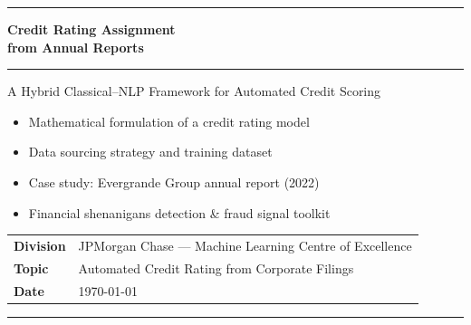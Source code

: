 \documentclass[12pt, a4paper]{article}
\begin{document}
\begin{titlepage}
  \centering
  \vspace*{2cm}

  {\color{jpblue}\rule{\linewidth}{2pt}}
  \vspace{0.5cm}

  {\Huge\bfseries\color{jpblue}
    Credit Rating Assignment\\[0.3em]
    from Annual Reports}

  \vspace{0.4cm}
  {\color{accentgold}\rule{0.6\linewidth}{1.5pt}}
  \vspace{0.5cm}

  {\large\color{jpdark}
    A Hybrid Classical–NLP Framework for Automated Credit Scoring}

  \vspace{1.5cm}

  \begin{tcolorbox}[
    colback=jpblue!5, colframe=jpblue,
    width=0.85\linewidth, arc=6pt,
    title={\bfseries\color{white} Project Scope},
    coltitle=white, colbacktitle=jpblue
  ]
    \begin{itemize}[leftmargin=1em, itemsep=3pt]
      \item[\textbf{a.}] Mathematical formulation of a credit rating model
      \item[\textbf{b.}] Data sourcing strategy and training dataset
      \item[\textbf{c.}] Case study: Evergrande Group annual report (2022)
      \item[\textbf{d.}] Financial shenanigans detection \& fraud signal toolkit
    \end{itemize}
  \end{tcolorbox}

  \vspace{2cm}

  \begin{tabular}{ll}
    \textbf{Division}   & JPMorgan Chase — Machine Learning Centre of Excellence \\[4pt]
    \textbf{Topic}      & Automated Credit Rating from Corporate Filings \\[4pt]
    \textbf{Date}       & \today \\[4pt]
  \end{tabular}

  \vfill
  {\color{jpblue}\rule{\linewidth}{2pt}}
\end{titlepage}
\end{document}
